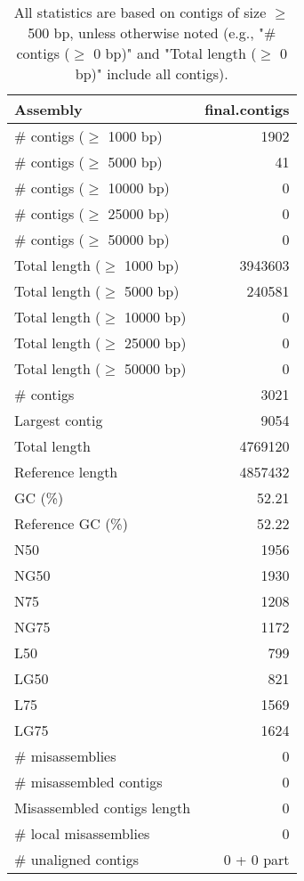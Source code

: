 \documentclass[12pt,a4paper]{article}
\begin{document}
\begin{table}[ht]
\begin{center}
\caption{All statistics are based on contigs of size $\geq$ 500 bp, unless otherwise noted (e.g., "\# contigs ($\geq$ 0 bp)" and "Total length ($\geq$ 0 bp)" include all contigs).}
\begin{tabular}{|l*{1}{|r}|}
\hline
Assembly & final.contigs \\ \hline
\# contigs ($\geq$ 1000 bp) & 1902 \\ \hline
\# contigs ($\geq$ 5000 bp) & 41 \\ \hline
\# contigs ($\geq$ 10000 bp) & 0 \\ \hline
\# contigs ($\geq$ 25000 bp) & 0 \\ \hline
\# contigs ($\geq$ 50000 bp) & 0 \\ \hline
Total length ($\geq$ 1000 bp) & 3943603 \\ \hline
Total length ($\geq$ 5000 bp) & 240581 \\ \hline
Total length ($\geq$ 10000 bp) & 0 \\ \hline
Total length ($\geq$ 25000 bp) & 0 \\ \hline
Total length ($\geq$ 50000 bp) & 0 \\ \hline
\# contigs & 3021 \\ \hline
Largest contig & 9054 \\ \hline
Total length & 4769120 \\ \hline
Reference length & 4857432 \\ \hline
GC (\%) & 52.21 \\ \hline
Reference GC (\%) & 52.22 \\ \hline
N50 & 1956 \\ \hline
NG50 & 1930 \\ \hline
N75 & 1208 \\ \hline
NG75 & 1172 \\ \hline
L50 & 799 \\ \hline
LG50 & 821 \\ \hline
L75 & 1569 \\ \hline
LG75 & 1624 \\ \hline
\# misassemblies & 0 \\ \hline
\# misassembled contigs & 0 \\ \hline
Misassembled contigs length & 0 \\ \hline
\# local misassemblies & 0 \\ \hline
\# unaligned contigs & 0 + 0 part \\ \hline

\end{tabular}
\end{center}
\end{table}
\end{document}

